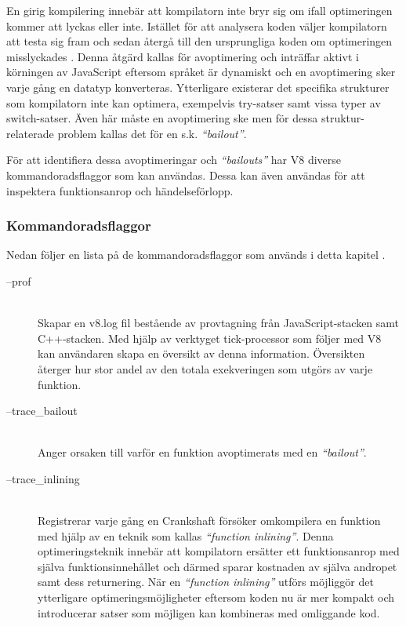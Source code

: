 En girig kompilering innebär att kompilatorn inte bryr sig om ifall
optimeringen kommer att lyckas eller inte. Istället för att analysera koden
väljer kompilatorn att testa sig fram och sedan återgå till den ursprungliga
koden om optimeringen misslyckades \citep{mk10}. Denna åtgärd kallas för
avoptimering och inträffar aktivt i körningen av JavaScript eftersom språket
är dynamiskt och en avoptimering sker varje gång en datatyp konverteras.
Ytterligare existerar det specifika strukturer som kompilatorn inte kan
optimera, exempelvis try-satser samt vissa typer av switch-satser. Även här
måste en avoptimering ske men för dessa struktur-relaterade problem kallas det
för en s.k. \textit{``bailout''}.

För att identifiera dessa avoptimeringar och \textit{``bailouts''} har V8 diverse
kommandoradsflaggor som kan användas. Dessa kan även användas för att
inspektera funktionsanrop och händelseförlopp.

\subsubsection{Kommandoradsflaggor}

Nedan följer en lista på de kommandoradsflaggor som används i detta kapitel
\citep{v8profiler}.

\begin{description}
  \item[--prof] \hfill \\
    Skapar en v8.log fil bestående av provtagning från JavaScript-stacken
    samt C++-stacken. Med hjälp av verktyget tick-processor som följer med V8
    kan användaren skapa en översikt av denna information. Översikten återger
    hur stor andel av den totala exekveringen som utgörs av varje funktion.
  \item[--trace_bailout] \hfill \\
    Anger orsaken till varför en funktion avoptimerats med en
    \textit{``bailout''}.
  \item[--trace_inlining] \hfill \\
    Registrerar varje gång en Crankshaft försöker omkompilera en funktion med
    hjälp av en teknik som kallas \textit{``function inlining''}. Denna
    optimeringsteknik innebär att kompilatorn ersätter ett funktionsanrop med
    själva funktionsinnehållet och därmed sparar kostnaden av själva andropet
    samt dess returnering. När en \textit{``function inlining''} utförs
    möjliggör det ytterligare optimeringsmöjligheter eftersom koden nu är mer
    kompakt och introducerar satser som möjligen kan kombineras med omliggande
    kod.
\end{description}

